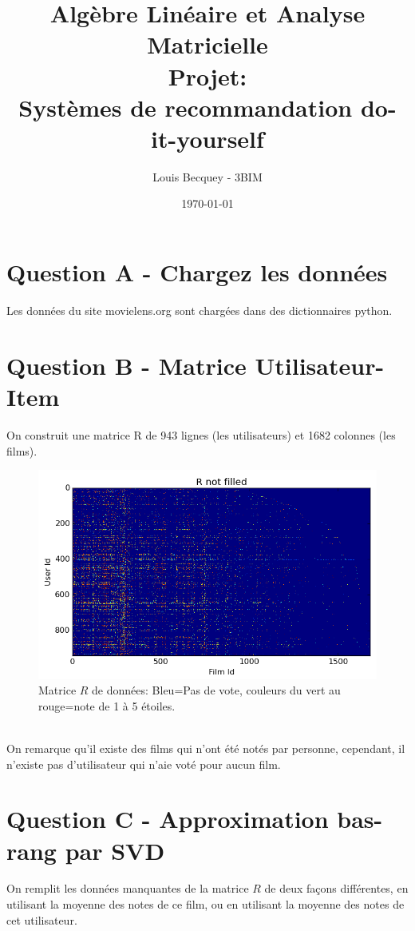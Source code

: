 \documentclass[12pt,a4paper]{article}
\begin{document}
\title{Algèbre Linéaire et Analyse Matricielle\\ Projet: \\ Systèmes de recommandation do-it-yourself}
\date{\today}
\author{Louis Becquey - 3BIM}
\maketitle
\newpage

\section{Question A - Chargez les données}
Les données du site movielens.org sont chargées dans des dictionnaires python.
\section{Question B - Matrice Utilisateur-Item}
On construit une matrice R de 943 lignes (les utilisateurs) et 1682 colonnes (les films).
\begin{figure}[h!]
	\centering
	\includegraphics[scale=0.5]{R-Not-Filled.png}
	\caption{Matrice $R$ de données: Bleu=Pas de vote, couleurs du vert au rouge=note de 1 à 5 étoiles.}
\end{figure}
\\
On remarque qu'il existe des films qui n'ont été notés par personne, cependant, il n'existe pas d'utilisateur qui n'aie voté pour aucun film.
\newpage

\section{Question C - Approximation bas-rang par SVD}
On remplit les données manquantes de la matrice $R$ de deux façons différentes, en utilisant la moyenne des notes de ce film, ou en utilisant la moyenne des notes de cet utilisateur.\\
\end{document}
